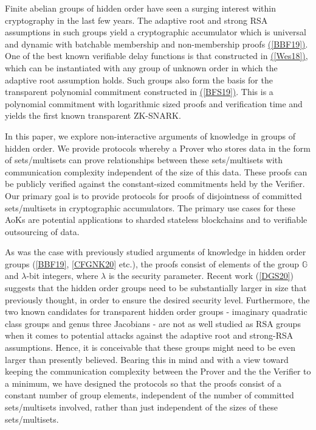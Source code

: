 \documentclass[11pt, lettersize, notitlepage, leqno, footskip=0.6cm]{article}
\newcommand{\mb}{\mathbb}
\newcommand{\lam}{\lambda}
\numberwithin{equation}{section}
\begin{document}
Finite abelian groups of hidden order have seen a surging interest within cryptography in the last few years. The adaptive root and strong RSA assumptions in such groups yield a cryptographic accumulator which is universal and dynamic with batchable membership and non-membership proofs \hyperlink{BBF19}{([BBF19])}. One of the best known verifiable delay functions is that constructed in \hyperlink{Wes18}{([Wes18])}, which can be instantiated with any group of unknown order in which the adaptive root assumption holds. Such groups also form the basis for the transparent polynomial commitment constructed in \hyperlink{BFS19}{([BFS19])}. This is a polynomial commitment with logarithmic sized proofs and verification time and yields the first known transparent ZK-SNARK.

In this paper, we explore non-interactive arguments of knowledge in groups of hidden order. We provide protocols whereby a Prover who stores data in the form of sets/multisets can prove relationships between these sets/multisets with communication complexity independent of the size of this data. These proofs can be publicly verified against the constant-sized commitments held by the Verifier. Our primary goal is to provide protocols for proofs of disjointness of committed sets/multisets in cryptographic accumulators. The primary use cases for these AoKs are potential applications to sharded stateless blockchains and to verifiable outsourcing of data.

As was the case with previously studied arguments of knowledge in hidden order groups (\hyperlink{BBF19}{[BBF19]}, \hyperlink{CFGKN20}{[CFGNK20]} etc.), the proofs consist of elements of the group $\mb{G}$ and $\lam$-bit integers, where $\lam$ is the security parameter. Recent work (\hyperlink{DGS20}{[DGS20]}) suggests that the hidden order groups need to be substantially larger in size that previously thought, in order to ensure the desired security level. Furthermore, the two known candidates for transparent hidden order groups - imaginary quadratic class groups and genus three Jacobians - are not as well studied as RSA groups when it comes to potential attacks against the adaptive root and strong-RSA assumptions. Hence, it is conceivable that these groups might need to be even larger than presently believed. Bearing this in mind and with a view toward keeping the communication complexity between the Prover and the the Verifier to a minimum, we have designed the protocols so that the proofs consist of a constant number of group elements, independent of the number of committed sets/multisets involved, rather than just independent of the sizes of these sets/multisets. %
\end{document}

